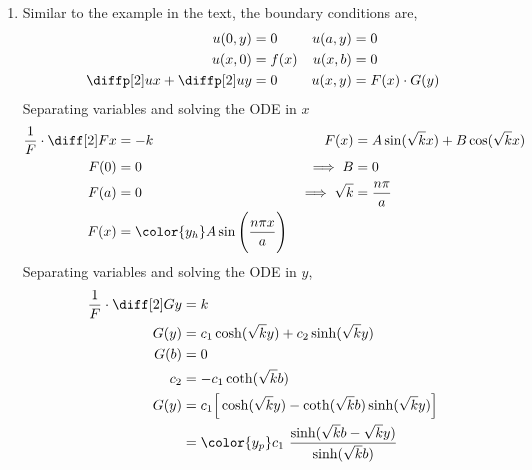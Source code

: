 \begin{enumerate}
    \item Similar to the example in the text, the boundary conditions are,
          \begin{align}
              u(0, y)                    & = 0               &
              u(a, y)                    & = 0                 \\
              u(x, 0)                    & = f(x)            &
              u(x, b)                    & = 0                 \\
              \diffp[2] ux +\diffp[2] uy & = 0               &
              u(x, y)                    & = F(x) \cdot G(y)
          \end{align}
          Separating variables and solving the ODE in $ x $
          \begin{align}
              \frac{1}{F} \cdot \diff[2] Fx & = -k                                  &
              F(x)                          & = A\sin(\sqrt{k}x) + B\cos(\sqrt{k}x)   \\
              F(0)                          & = 0                                   &
              \implies B                    & = 0                                     \\
              F(a)                          & = 0                                   &
              \implies \sqrt{k}             & = \frac{n\pi}{a}                        \\
              F(x)                          & = \color{y_h} A\sin\Bigg(
              \frac{n\pi x}{a} \Bigg)
          \end{align}
          Separating variables and solving the ODE in $ y $,
          \begin{align}
              \frac{1}{F} \cdot \diff[2] Gy & = k                        \\
              G(y)                          & = c_1 \cosh(\sqrt{k}y)
              + c_2\sinh(\sqrt{k}y)                                      \\
              G(b)                          & = 0                        \\
              c_2                           & = -c_1 \coth(\sqrt{k}b)    \\
              G(y)                          & = c_1 \Big[
              \cosh(\sqrt{k}y) - \coth(\sqrt{k}b) \sinh(\sqrt{k}y) \Big] \\
                                            & = \color{y_p} c_1
              \ \frac{\sinh(\sqrt{k}b-\sqrt{k}y)}{\sinh(\sqrt{k}b)}

\end{align}
\end{enumerate}

